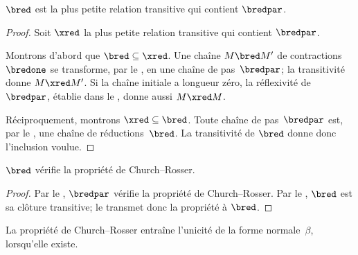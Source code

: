 \documentclass[../../../include/open-logic-section]{subfiles}
\begin{document}
\begin{lem}
$\bred$ est la plus petite relation
transitive qui contient $\bredpar$.
\end{lem}

\begin{proof}
Soit $\xred$ la plus petite relation
transitive qui contient $\bredpar$.

Montrons d'abord que
$\bred\subseteq\xred$. Une chaîne
$M\bred M'$ de contractions~$\bredone$
se transforme, par le ,
en une chaîne de pas~$\bredpar$; la
transitivité donne $M\xred M'$.
Si la chaîne initiale a longueur zéro,
la réflexivité de $\bredpar$, établie dans le
, donne aussi
$M\xred M$.

Réciproquement, montrons
$\xred\subseteq\bred$. Toute chaîne
de pas~$\bredpar$ est, par le
, une chaîne de
réductions~$\bred$. La transitivité de
$\bred$ donne donc l'inclusion voulue.
\end{proof}

\begin{thm}
$\bred$ vérifie la propriété de
Church--Rosser.
\end{thm}

\begin{proof}
Par le , $\bredpar$ vérifie
la propriété de Church--Rosser.
Par le , $\bred$ est sa
clôture transitive; le 
transmet donc la propriété à $\bred$.
\end{proof}

La propriété de Church--Rosser entraîne l'unicité de la forme
normale~$\beta$, lorsqu'elle existe.
\end{document}
